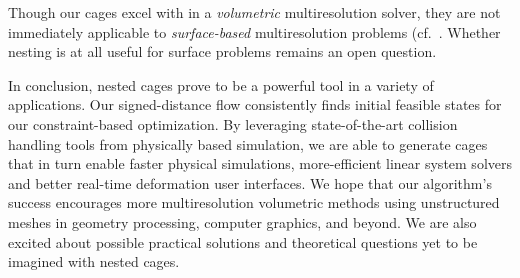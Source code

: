 Though our cages excel with in a \emph{volumetric} multiresolution solver, they
are not immediately applicable to \emph{surface-based} multiresolution problems
(cf.\ \cite{Aksoylu2005msu,Chuang:2009:ELO}. Whether nesting is at all useful
for surface problems remains an open question.

In conclusion, nested cages prove to be a powerful tool in a variety of
applications. 
%
Our signed-distance flow consistently finds initial feasible states for our
constraint-based optimization.
%
By leveraging state-of-the-art collision handling tools from physically based
simulation, we are able to generate cages that in turn enable faster physical
simulations, more-efficient linear system solvers and better real-time
deformation user interfaces.
%
We hope that our algorithm's success encourages more multiresolution volumetric
methods using unstructured meshes in geometry processing, computer graphics,
and beyond.
%
We are also excited about possible practical solutions and theoretical
questions yet to be imagined with nested cages.
